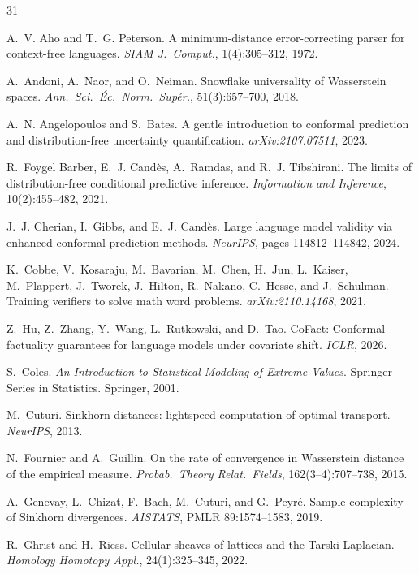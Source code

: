 \begin{thebibliography}{31}

 A.~V. Aho and T.~G. Peterson. A minimum-distance
error-correcting parser for context-free languages. \emph{SIAM J.\ Comput.},
1(4):305--312, 1972.

 A.~Andoni, A.~Naor, and O.~Neiman. Snowflake
universality of Wasserstein spaces. \emph{Ann.\ Sci.\ \'Ec.\ Norm.\ Sup\'er.},
51(3):657--700, 2018.

 A.~N. Angelopoulos and S.~Bates. A gentle
introduction to conformal prediction and distribution-free uncertainty
quantification. \emph{arXiv:2107.07511}, 2023.

 R.~Foygel Barber, E.~J. Cand\`es, A.~Ramdas, and R.~J.
Tibshirani. The limits of distribution-free conditional predictive inference.
\emph{Information and Inference}, 10(2):455--482, 2021.

 J.~J. Cherian, I.~Gibbs, and E.~J. Cand\`es. Large
language model validity via enhanced conformal prediction methods.
\emph{NeurIPS}, pages 114812--114842, 2024.

 K.~Cobbe, V.~Kosaraju, M.~Bavarian, M.~Chen, H.~Jun,
L.~Kaiser, M.~Plappert, J.~Tworek, J.~Hilton, R.~Nakano, C.~Hesse, and
J.~Schulman. Training verifiers to solve math word problems.
\emph{arXiv:2110.14168}, 2021.

 Z.~Hu, Z.~Zhang, Y.~Wang, L.~Rutkowski, and D.~Tao.
CoFact: Conformal factuality guarantees for language models under covariate
shift. \emph{ICLR}, 2026.

 S.~Coles. \emph{An Introduction to Statistical Modeling of
Extreme Values}. Springer Series in Statistics. Springer, 2001.

 M.~Cuturi. Sinkhorn distances: lightspeed computation of
optimal transport. \emph{NeurIPS}, 2013.

 N.~Fournier and A.~Guillin. On the rate of convergence
in Wasserstein distance of the empirical measure. \emph{Probab.\ Theory
Relat.\ Fields}, 162(3--4):707--738, 2015.

 A.~Genevay, L.~Chizat, F.~Bach, M.~Cuturi, and
G.~Peyr\'e. Sample complexity of Sinkhorn divergences. \emph{AISTATS}, PMLR
89:1574--1583, 2019.

 R.~Ghrist and H.~Riess. Cellular sheaves of lattices and
the Tarski Laplacian. \emph{Homology Homotopy Appl.}, 24(1):325--345, 2022.


\end{thebibliography}
